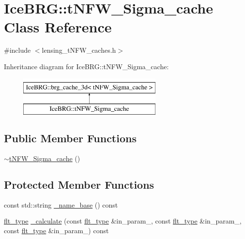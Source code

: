 \hypertarget{classIceBRG_1_1tNFW__Sigma__cache}{}\section{Ice\+B\+R\+G\+:\+:t\+N\+F\+W\+\_\+\+Sigma\+\_\+cache Class Reference}
\label{classIceBRG_1_1tNFW__Sigma__cache}


{\ttfamily \#include $<$lensing\+\_\+t\+N\+F\+W\+\_\+caches.\+h$>$}

Inheritance diagram for Ice\+B\+R\+G\+:\+:t\+N\+F\+W\+\_\+\+Sigma\+\_\+cache\+:\begin{figure}[H]
\begin{center}
\leavevmode
\includegraphics[height=2.000000cm]{classIceBRG_1_1tNFW__Sigma__cache}
\end{center}
\end{figure}
\subsection*{Public Member Functions}
\begin{DoxyCompactItemize}
\item 
\hyperlink{classIceBRG_1_1tNFW__Sigma__cache_ad1eb185ee4cf56fcea3fd56ba3f768b5}{$\sim$t\+N\+F\+W\+\_\+\+Sigma\+\_\+cache} ()
\end{DoxyCompactItemize}
\subsection*{Protected Member Functions}
\begin{DoxyCompactItemize}
\item 
const std\+::string \hyperlink{classIceBRG_1_1tNFW__Sigma__cache_add7a48fb279fed783f4670c3cd940d7e}{\+\_\+name\+\_\+base} () const 
\item 
\hyperlink{lib_2IceBRG__main_2common_8h_ad0f130a56eeb944d9ef2692ee881ecc4}{flt\+\_\+type} \hyperlink{classIceBRG_1_1tNFW__Sigma__cache_a362d58c29eda67d75183d090385649bf}{\+\_\+calculate} (const \hyperlink{lib_2IceBRG__main_2common_8h_ad0f130a56eeb944d9ef2692ee881ecc4}{flt\+\_\+type} \&in\+\_\+param\+\_, const \hyperlink{lib_2IceBRG__main_2common_8h_ad0f130a56eeb944d9ef2692ee881ecc4}{flt\+\_\+type} \&in\+\_\+param\+\_, const \hyperlink{lib_2IceBRG__main_2common_8h_ad0f130a56eeb944d9ef2692ee881ecc4}{flt\+\_\+type} \&in\+\_\+param\+\_) const 
\end{DoxyCompactItemize}
